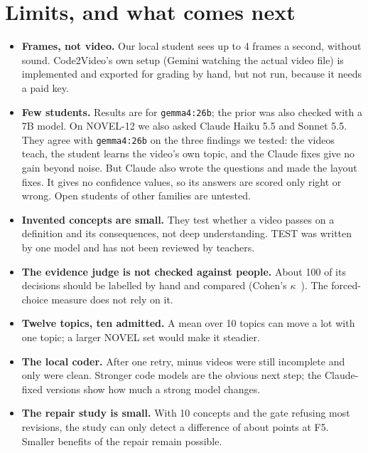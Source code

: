 \documentclass[11pt]{article}
\begin{document}


\section{Limits, and what comes next}

\begin{itemize}
  \item \textbf{Frames, not video.} Our local student sees up to 4 frames a second, without sound. Code2Video's own
  setup (Gemini watching the actual video file) is implemented and exported for grading by hand, but not run, because
  it needs a paid key.
  \item \textbf{Few students.} Results are for \texttt{gemma4:26b}; the prior was also checked with a 7B model. On
  NOVEL-12 we also asked Claude Haiku 5.5 and Sonnet 5.5. They agree with \texttt{gemma4:26b} on the three findings we
  tested: the videos teach, the student learns the video's own topic, and the Claude fixes give no gain beyond noise.
  But Claude also wrote the questions and made the layout fixes. It gives no confidence values, so its answers are
  scored only right or wrong. Open students of other families are untested.
  \item \textbf{Invented concepts are small.} They test whether a video passes on a definition and its consequences,
  not deep understanding. TEST was written by one model and has not been reviewed by teachers.
  \item \textbf{The evidence judge is not checked against people.} About 100 of its decisions should be labelled by
  hand and compared (Cohen's $\kappa$~\cite{cohen1960}). The forced-choice measure does not rely on it.
  \item \textbf{Twelve topics, ten admitted.} A mean over 10 topics can move a lot with one topic; a larger NOVEL set
  would make it steadier.
  \item \textbf{The local coder.} After one retry, \AdmTotal{} minus \AdmComplete{} videos were still incomplete and
  only \AdmClean{} were clean. Stronger code models are the obvious next step; the Claude-fixed versions show how much a
  strong model changes.
  \item \textbf{The repair study is small.} With 10 concepts and the gate refusing most revisions, the study can only
  detect a difference of about \NMStageFiveMDE{} points at F5. Smaller benefits of the repair remain possible.

\end{itemize}
\end{document}
